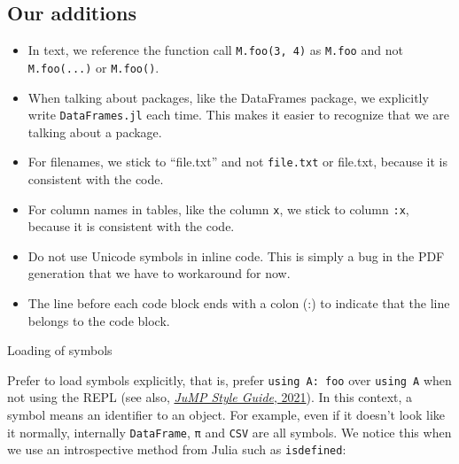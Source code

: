 \documentclass[
  notoc %
]{tufte-book}
\makeatletter
\providecommand{\tightlist}{%
  \setlength{\itemsep}{0pt}\setlength{\parskip}{0pt}
}
\newcommand{\passthrough}[1]{#1}
\renewcommand\subsubsection{%
\@startsection{subsubsection}{3}{\z@ }{-3.25ex\@plus -1ex \@minus -.2ex}{1.5ex \@plus .2ex}{\normalfont \normalsize \bfseries }
}
\makeatother
\begin{document}
\hypertarget{our-additions}{%
\subsection{Our additions}\label{our-additions}}

\begin{itemize}
\tightlist
\item
  In text, we reference the function call
  \passthrough{\lstinline!M.foo(3, 4)!} as
  \passthrough{\lstinline!M.foo!} and not
  \passthrough{\lstinline!M.foo(...)!} or
  \passthrough{\lstinline!M.foo()!}.
\item
  When talking about packages, like the DataFrames package, we
  explicitly write \passthrough{\lstinline!DataFrames.jl!} each time.
  This makes it easier to recognize that we are talking about a package.
\item
  For filenames, we stick to ``file.txt'' and not
  \passthrough{\lstinline!file.txt!} or file.txt, because it is
  consistent with the code.
\item
  For column names in tables, like the column
  \passthrough{\lstinline!x!}, we stick to column
  \passthrough{\lstinline!:x!}, because it is consistent with the code.
\item
  Do not use Unicode symbols in inline code. This is simply a bug in the
  PDF generation that we have to workaround for now.
\item
  The line before each code block ends with a colon (:) to indicate that
  the line belongs to the code block.
\end{itemize}

\hypertarget{loading-of-symbols}{%
\subsubsection{Loading of symbols}\label{loading-of-symbols}}

Prefer to load symbols explicitly, that is, prefer
\passthrough{\lstinline!using A: foo!} over
\passthrough{\lstinline!using A!} when not using the REPL (see also,
\protect\hyperlink{ref-jump2021using}{\emph{JuMP Style Guide}, 2021}).
In this context, a symbol means an identifier to an object. For example,
even if it doesn't look like it normally, internally
\passthrough{\lstinline!DataFrame!}, \passthrough{\lstinline!π!} and
\passthrough{\lstinline!CSV!} are all symbols. We notice this when we
use an introspective method from Julia such as
\passthrough{\lstinline!isdefined!}:
\end{document}
